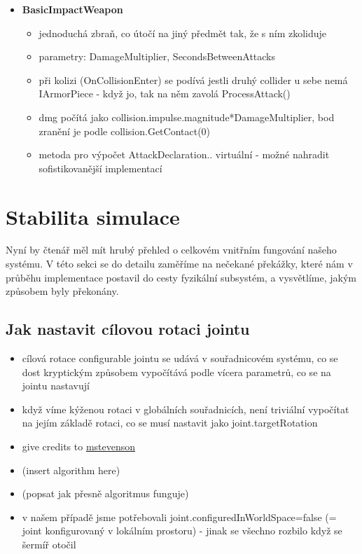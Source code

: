 \begin{itemize}
\begin{itemize}
      \end{itemize} 
  \item \textbf{BasicImpactWeapon}
      \begin{itemize}
        \item jednoduchá zbraň, co útočí na jiný předmět tak, že s ním zkoliduje 
        \item parametry: DamageMultiplier, SecondsBetweenAttacks
        \item při kolizi (OnCollisionEnter) se podívá jestli druhý collider u sebe nemá IArmorPiece - když jo, tak na něm zavolá ProcessAttack()
        \item dmg počítá jako collision.impulse.magnitude*DamageMultiplier, bod zranění je podle collision.GetContact(0)
        \item metoda pro výpočet AttackDeclaration.. virtuální - možné nahradit sofistikovanější implementací
      \end{itemize} 
  
\end{itemize}


\section{Stabilita simulace} \label{simulationStabilitySection}

Nyní by čtenář měl mít hrubý přehled o celkovém vnitřním fungování našeho systému. V této sekci se do detailu zaměříme na nečekané překážky, které nám v průběhu implementace postavil do cesty fyzikální subsystém, a vysvětlíme, jakým způsobem byly překonány.


\subsection{Jak nastavit cílovou rotaci jointu} \label{howToSetJointsTargetRotationSection}
\begin{itemize}
  \item cílová rotace configurable jointu se udává v souřadnicovém systému, co se dost kryptickým způsobem vypočítává podle vícera parametrů, co se na jointu nastavují
  \item když víme kýženou rotaci v globálních souřadnicích, není triviální vypočítat na jejím základě rotaci, co se musí nastavit jako joint.targetRotation
  \item give credits to \href{https://gist.github.com/mstevenson/4958837}{mstevenson}
  \item (insert algorithm here)
  \item (popsat jak přesně algoritmus funguje)
  \item v našem případě jsme potřebovali joint.configuredInWorldSpace=false (= joint konfigurovaný v lokálním prostoru) - jinak se všechno rozbilo když se šermíř otočil 
\end{itemize}

